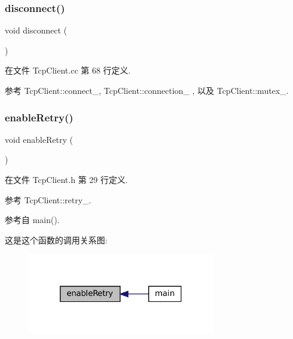 \subsubsection{\texorpdfstring{disconnect()}{disconnect()}}
{\footnotesize\ttfamily void disconnect (\begin{DoxyParamCaption}{ }\end{DoxyParamCaption})}



在文件 Tcp\+Client.\+cc 第 68 行定义.



参考 Tcp\+Client\+::connect\+\_\+, Tcp\+Client\+::connection\+\_\+ , 以及 Tcp\+Client\+::mutex\+\_\+.

\mbox{\label{classmuduo_1_1TcpClient_a24bbe5c717dfa26078c7deb6cbf9a71c}} 
\subsubsection{\texorpdfstring{enable\+Retry()}{enableRetry()}}
{\footnotesize\ttfamily void enable\+Retry (\begin{DoxyParamCaption}{ }\end{DoxyParamCaption})\hspace{0.3cm}{\ttfamily [inline]}}



在文件 Tcp\+Client.\+h 第 29 行定义.



参考 Tcp\+Client\+::retry\+\_\+.



参考自 main().

这是这个函数的调用关系图\+:
\nopagebreak
\begin{figure}[H]
\begin{center}
\leavevmode
\includegraphics[width=232pt]{classmuduo_1_1TcpClient_a24bbe5c717dfa26078c7deb6cbf9a71c_icgraph}
\end{center}
\end{figure}
\mbox{\label{classmuduo_1_1TcpClient_ae2e5d102f7a519e65019cd5f09acea72}} 
